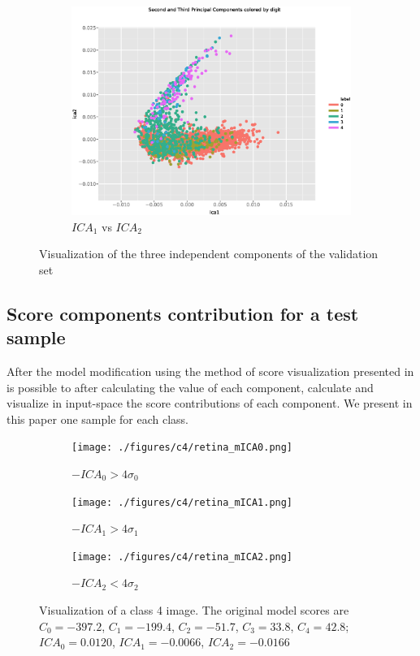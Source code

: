 \documentclass{llncs}
\begin{document}
\begin{figure}[h]
\begin{subfigure}[b]{0.32\textwidth}
		\includegraphics[width=\textwidth]{./figures/ica1vsica2.eps}
		\caption{$ICA_1$ vs $ICA_2$}
	\end{subfigure}
	\caption{Visualization of the three independent components of the validation set}  
	\label{fig:ica_components} 
\end{figure}

\subsection{Score components contribution for a test sample}

After the model modification using the method of score visualization presented in \cite{de2017deep} is possible to after calculating the value of each component, calculate and visualize in input-space the score contributions of each component. We present in this paper one sample for each class. 

\begin{figure}[h!]
	\centering
	\begin{subfigure}[b]{0.32\textwidth}
		\centering
		\texttt{[image: ./figures/c4/retina\_mICA0.png]}
		\caption{$-ICA_0 > 4 \sigma_0$}	
	\end{subfigure}
	\hfill    
	\begin{subfigure}[b]{0.32\textwidth}
		\centering
		\texttt{[image: ./figures/c4/retina\_mICA1.png]}
		\caption{$-ICA_1 > 4 \sigma_1$}
	\end{subfigure}
	\hfill 
	\begin{subfigure}[b]{0.32\textwidth}
		\centering
		\texttt{[image: ./figures/c4/retina\_mICA2.png]}
		\caption{$-ICA_2 < 4 \sigma_2$}
	\end{subfigure}
	\caption{Visualization of a class 4 image. The original model scores are $C_0 = -397.2$, $C_1 = -199.4$,  $C_2 = -51.7$,   $C_3 = 33.8$,   $C_4 = 42.8$; $ICA_0 = 0.0120$, $ICA_1 = -0.0066$, $ICA_2 = -0.0166$}  
	\label{fig:ica_components_c4} 
\end{figure}
\end{document}
